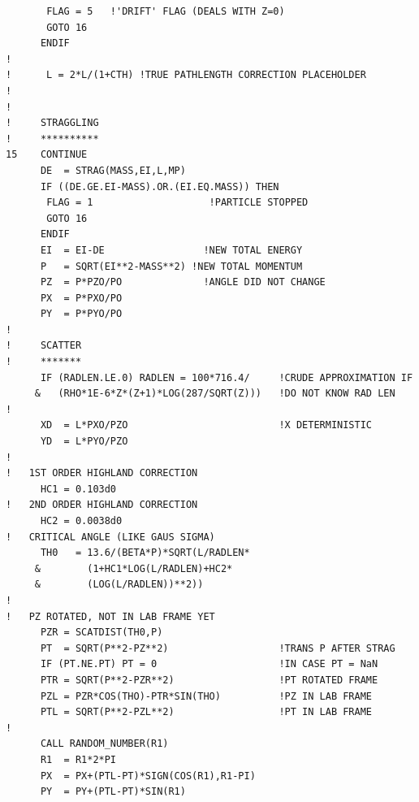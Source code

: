 \begin{lstlisting}
       FLAG = 5   !'DRIFT' FLAG (DEALS WITH Z=0)
       GOTO 16
      ENDIF
!
!      L = 2*L/(1+CTH) !TRUE PATHLENGTH CORRECTION PLACEHOLDER
!
!
!     STRAGGLING
!     **********
15    CONTINUE
      DE  = STRAG(MASS,EI,L,MP)
      IF ((DE.GE.EI-MASS).OR.(EI.EQ.MASS)) THEN
       FLAG = 1                    !PARTICLE STOPPED
       GOTO 16
      ENDIF
      EI  = EI-DE                 !NEW TOTAL ENERGY
      P   = SQRT(EI**2-MASS**2) !NEW TOTAL MOMENTUM
      PZ  = P*PZO/PO              !ANGLE DID NOT CHANGE
      PX  = P*PXO/PO
      PY  = P*PYO/PO
!
!     SCATTER
!     *******
      IF (RADLEN.LE.0) RADLEN = 100*716.4/     !CRUDE APPROXIMATION IF
     &   (RHO*1E-6*Z*(Z+1)*LOG(287/SQRT(Z)))   !DO NOT KNOW RAD LEN
!
      XD  = L*PXO/PZO                          !X DETERMINISTIC
      YD  = L*PYO/PZO
!
!   1ST ORDER HIGHLAND CORRECTION
      HC1 = 0.103d0
!   2ND ORDER HIGHLAND CORRECTION
      HC2 = 0.0038d0
!   CRITICAL ANGLE (LIKE GAUS SIGMA)
      TH0   = 13.6/(BETA*P)*SQRT(L/RADLEN*
     &        (1+HC1*LOG(L/RADLEN)+HC2*
     &        (LOG(L/RADLEN))**2))
!
!   PZ ROTATED, NOT IN LAB FRAME YET
      PZR = SCATDIST(TH0,P)
      PT  = SQRT(P**2-PZ**2)                   !TRANS P AFTER STRAG
      IF (PT.NE.PT) PT = 0                     !IN CASE PT = NaN
      PTR = SQRT(P**2-PZR**2)                  !PT ROTATED FRAME
      PZL = PZR*COS(THO)-PTR*SIN(THO)          !PZ IN LAB FRAME
      PTL = SQRT(P**2-PZL**2)                  !PT IN LAB FRAME
!
      CALL RANDOM_NUMBER(R1)
      R1  = R1*2*PI
      PX  = PX+(PTL-PT)*SIGN(COS(R1),R1-PI)
      PY  = PY+(PTL-PT)*SIN(R1)


\end{lstlisting}
